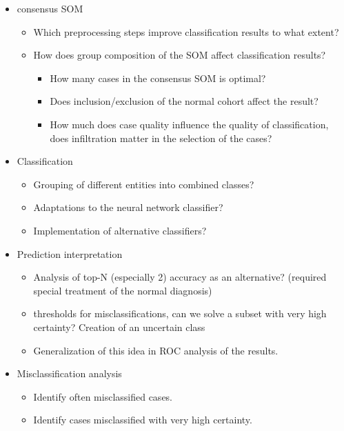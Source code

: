 \documentclass[11pt,a4paper]{article}
\begin{document}
\begin{itemize}
   \item consensus SOM
      \begin{itemize}
         \item Which preprocessing steps improve classification results to what extent?
         \item How does group composition of the SOM affect classification results?
            \begin{itemize}
               \item How many cases in the consensus SOM is optimal?
               \item Does inclusion/exclusion of the normal cohort affect the result?
               \item How much does case quality influence the quality of classification, does infiltration matter in the selection of the cases?
            \end{itemize}
      \end{itemize}
   \item Classification
      \begin{itemize}
         \item Grouping of different entities into combined classes?
         \item Adaptations to the neural network classifier?
         \item Implementation of alternative classifiers?
      \end{itemize}
   \item Prediction interpretation
      \begin{itemize}
         \item Analysis of top-N (especially 2) accuracy as an alternative? (required special treatment of the normal diagnosis)
         \item thresholds for misclassifications, can we solve a subset with very high certainty? Creation of an uncertain class
         \item Generalization of this idea in ROC analysis of the results.
      \end{itemize}
   \item Misclassification analysis
      \begin{itemize}
         \item Identify often misclassified cases.
         \item Identify cases misclassified with very high certainty.
      \end{itemize}
\end{itemize}
\end{document}
